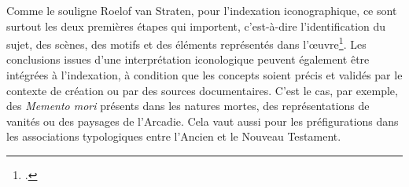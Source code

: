 Comme le souligne Roelof van Straten, pour l’indexation iconographique, ce sont surtout les deux premières étapes qui importent, c’est-à-dire l’identification du sujet, des scènes, des motifs et des éléments représentés dans l’œuvre\footcite{vanstratenPanofskyICONCLASS1986}. Les conclusions issues d’une interprétation iconologique peuvent également être intégrées à l’indexation, à condition que les concepts soient précis et validés par le contexte de création ou par des sources documentaires. C’est le cas, par exemple, des \textit{Memento mori} présents dans les natures mortes, des représentations de vanités ou des paysages de l’Arcadie. Cela vaut aussi pour les préfigurations dans les associations typologiques entre l’Ancien et le Nouveau Testament.